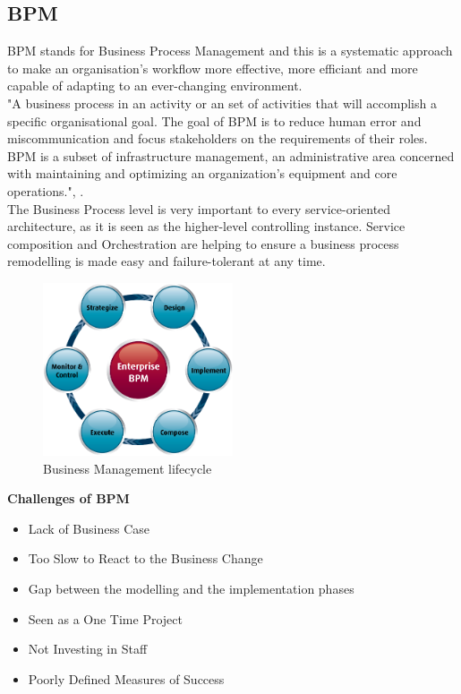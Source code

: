 \documentclass[12pt]{article}
\begin{document}
\subsection{BPM}
BPM stands for Business Process Management and this is a systematic approach to make an organisation's workflow more effective, more efficiant and more capable of adapting to an ever-changing environment. \\
"A business process in an activity or an set of activities that will accomplish a specific organisational goal. The goal of BPM is to reduce human error and miscommunication and focus stakeholders on the requirements of their roles. BPM is a subset of infrastructure management, an administrative area concerned with maintaining and optimizing an organization's equipment and core operations.", \cite{bpmdef}. \\
The Business Process level is very important to every service-oriented architecture, as it is seen as the higher-level controlling instance. Service composition and Orchestration are helping to ensure a business process remodelling is made easy and failure-tolerant at any time. \cite[page 114]{te}
\begin{figure}[here!]
	\centering
	\includegraphics[width=0.5\textwidth]{images/bpm.png}
	\caption{Business Management lifecycle \cite{muede2}}
	\label{fig:anfang}
	\end{figure}
	\FloatBarrier \noindent
\textbf{Challenges of BPM \cite{bpmchall}}
\begin{itemize}
\item Lack of Business Case
\item Too Slow to React to the Business Change
\item Gap between the modelling and the implementation phases
\item Seen as a One Time Project 
\item Not Investing in Staff
\item Poorly Defined Measures of Success 
\end{itemize}
\end{document}
